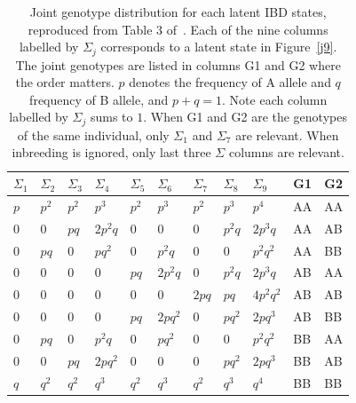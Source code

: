 \documentclass[11pt,Times]{article}
\def\cite{\citep}
\begin{document}
\begin{table}[htp] 
\begin{center}
\begin{tabular}{lllllllll|ll}
 $\Sigma_1$ &  $\Sigma_2$ &  $\Sigma_3$ &  $\Sigma_4$ &  $\Sigma_5$ &  $\Sigma_6$ &  $\Sigma_7$ &  $\Sigma_8$ &  $\Sigma_9$ &G1 & G2 \\
\hline 
 $p$ & $p^2$ & $p^2$ & $p^3$ & $p^2$ & $p^3$ & $p^2$ & $p^3$ & $p^4$ & AA &AA \\       
 $0$ & $0$ & $pq$ & $2p^2q$ & $0$ & $0$ & $0$ & $p^2q$ &$2p^3q$ &AA &AB  \\
 $0$ & $pq$ & $0$ & $pq^2$ & $0$ & $p^2q$ & $0$ & $0$ &$p^2q^2$ &AA &BB \\
 $0$ & $0$ & $0$ & $0$ & $pq$ & $2p^2q$ & $0$ & $p^2q$ &$2p^3q$ & AB &AA   \\
$0$ & $0$ & $0$ & $0$ & $0$ & $0$ & $2pq$ & $pq$ &$4p^2q^2$ & AB &AB   \\
 $0$ & $0$ & $0$ & $0$ & $pq$ & $2pq^2$ & $0$ & $pq^2$ &$2pq^3$ & AB &BB \\
$0$ & $pq$ & $0$ & $p^2q$ & $0$ & $pq^2$ & $0$ & $0$ &$p^2q^2$ & BB &AA   \\
 $0$ & $0$ & $pq$ & $2pq^2$ & $0$ & $0$ & $0$ & $pq^2$ &$2pq^3$ &BB &AB   \\
 $q$ & $q^2$ & $q^2$ & $q^3$ & $q^2$ & $q^3$ & $q^2$ & $q^3$ & $q^4$ &BB &BB \\       
  \end{tabular}
  \caption{Joint genotype distribution for each latent IBD states, reproduced from Table 3 of~\cite{thompson.13}. Each of the nine columns labelled by $\Sigma_j$ corresponds to a latent state in Figure~\ref{j9}. The joint genotypes are listed in columns G1 and G2 where the order matters. $p$ denotes the frequency of A allele and $q$ frequency of B allele, and $p+q=1$. Note each column labelled by $\Sigma_j$ sums to $1$. When G1 and G2 are the genotypes of the same individual, only $\Sigma_1$ and $\Sigma_7$ are relevant. When inbreeding is ignored, only last three $\Sigma$ columns are relevant.}
  \label{distr}
  \end{center}
\end{table}
\end{document}
